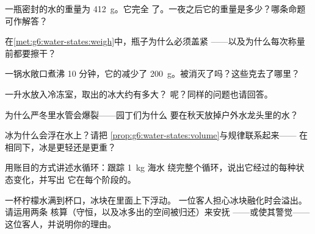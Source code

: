 \begin{exercise}[$\star$]\label{exo:g6:water-states:3}
一瓶密封的水的重量为 \qty{412}{g}。它完全
了。一夜之后它的重量是多少？哪条命题可作解答？
\end{exercise}

\begin{exercise}[$\star$]\label{exo:g6:water-states:4}
在\cref{met:g6:water-states:weigh}中，瓶子为什么必须盖紧
——以及为什么每次称量前都要擦干？
\end{exercise}

\begin{exercise}[$\star$]\label{exo:g6:water-states:5}
一锅水敞口煮沸 10 分钟，它的减少了
\qty{200}{g}。被消灭了吗？这些克去了哪里？
\end{exercise}

\begin{exercise}[$\star$]\label{exo:g6:water-states:6}
一升水放入冷冻室，取出的冰大约有多大？
呢？同样的问题也请回答。
\end{exercise}

\begin{exercise}[$\star$]\label{exo:g6:water-states:7}
为什么严冬里水管会爆裂——园丁们为什么
要在秋天放掉户外水龙头里的水？
\end{exercise}

\begin{exercise}[$\star$]\label{exo:g6:water-states:8}
冰为什么会浮在水上？请把
\cref{prop:g6:water-states:volume}与规律联系起来——
在相同下，冰是更轻还是更重？
\end{exercise}

\begin{exercise}[$\star\star$]\label{exo:g6:water-states:9}
用账目的方式讲述水循环：跟踪 \qty{1}{kg} 海水
绕完整个循环，说出它经过的每种状态变化，并写出
它在每个阶段的。
\end{exercise}

\begin{exercise}[$\star\star$]\label{exo:g6:water-states:10}
一杯柠檬水满到杯口，冰块在里面上下浮动。
一位客人担心冰块融化时会溢出。请运用两条
核算（守恒，以及冰多出的空间被归还）来安抚
——或使其警觉——这位客人，并说明你的理由。
\end{exercise}

